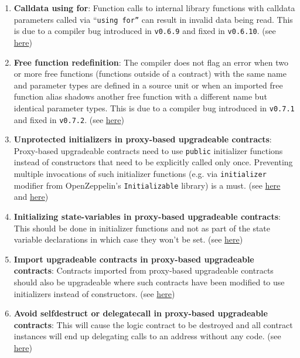 \begin{enumerate}
\item\textbf{Calldata using for}: Function calls to internal library functions with calldata parameters called via “\verb|using for”| can result in invalid data being read. This is due to a compiler bug introduced in \verb|v0.6.9| and fixed in \verb|v0.6.10|. (see \href{https://docs.soliditylang.org/en/v0.8.9/bugs.html}{here})

\item\textbf{Free function redefinition}: The compiler does not flag an error when two or more free functions (functions outside of a contract) with the same name and parameter types are defined in a source unit or when an imported free function alias shadows another free function with a different name but identical parameter types. This is due to a compiler bug introduced in \verb|v0.7.1| and fixed in \verb|v0.7.2|. (see \href{https://docs.soliditylang.org/en/v0.8.9/bugs.html}{here})

\item\textbf{Unprotected initializers in proxy-based upgradeable contracts}: Proxy-based upgradeable contracts need to use \verb|public| initializer functions instead of constructors that need to be explicitly called only once. Preventing multiple invocations of such initializer functions (e.g. via \verb|initializer| modifier from OpenZeppelin’s \verb|Initializable| library) is a must. (see \href{https://docs.openzeppelin.com/upgrades-plugins/1.x/writing-upgradeable\#initializers}{here} and \href{https://github.com/crytic/slither/wiki/Upgradeability-Checks\#initializer-is-not-called}{here})

\item\textbf{Initializing state-variables in proxy-based upgradeable contracts}: This should be done in initializer functions and not as part of the state variable declarations in which case they won’t be set. (see \href{https://docs.openzeppelin.com/upgrades-plugins/1.x/writing-upgradeable\#avoid-initial-values-in-field-declarations}{here})

\item\textbf{Import upgradeable contracts in proxy-based upgradeable contracts}: Contracts imported from proxy-based upgradeable contracts should also be upgradeable where such contracts have been modified to use initializers instead of constructors. (see \href{https://docs.openzeppelin.com/upgrades-plugins/1.x/writing-upgradeable\#use-upgradeable-libraries}{here})

\item\textbf{Avoid selfdestruct or delegatecall in proxy-based upgradeable contracts}: This will cause the logic contract to be destroyed and all contract instances will end up delegating calls to an address without any code. (see \href{https://docs.openzeppelin.com/upgrades-plugins/1.x/writing-upgradeable\#potentially-unsafe-operations}{here})


\end{enumerate}
